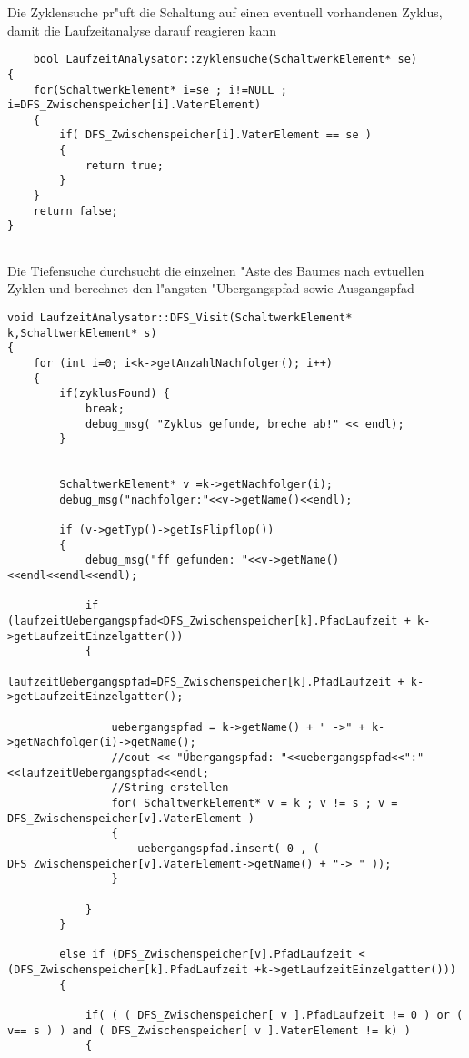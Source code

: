 \documentclass[11pt]{article}
\begin{document}
Die Zyklensuche pr"uft die Schaltung auf einen eventuell vorhandenen Zyklus, damit die Laufzeitanalyse darauf reagieren kann
\begin{lstlisting}
	bool LaufzeitAnalysator::zyklensuche(SchaltwerkElement* se)
{
    for(SchaltwerkElement* i=se ; i!=NULL ; i=DFS_Zwischenspeicher[i].VaterElement)
    {
        if( DFS_Zwischenspeicher[i].VaterElement == se )
        {
            return true;
        }
    }
    return false;
}


\end{lstlisting}


Die Tiefensuche durchsucht die einzelnen "Aste des Baumes nach evtuellen Zyklen und berechnet den l"angsten "Ubergangspfad sowie Ausgangspfad

\begin{lstlisting}
void LaufzeitAnalysator::DFS_Visit(SchaltwerkElement* k,SchaltwerkElement* s)
{
    for (int i=0; i<k->getAnzahlNachfolger(); i++)
    {
        if(zyklusFound) {
            break;
            debug_msg( "Zyklus gefunde, breche ab!" << endl);
        }


        SchaltwerkElement* v =k->getNachfolger(i);
        debug_msg("nachfolger:"<<v->getName()<<endl);

        if (v->getTyp()->getIsFlipflop())
        {
            debug_msg("ff gefunden: "<<v->getName()<<endl<<endl<<endl);

            if (laufzeitUebergangspfad<DFS_Zwischenspeicher[k].PfadLaufzeit + k->getLaufzeitEinzelgatter())
            {
                laufzeitUebergangspfad=DFS_Zwischenspeicher[k].PfadLaufzeit + k->getLaufzeitEinzelgatter();

                uebergangspfad = k->getName() + " ->" + k->getNachfolger(i)->getName();
                //cout << "Übergangspfad: "<<uebergangspfad<<":"<<laufzeitUebergangspfad<<endl;
                //String erstellen
                for( SchaltwerkElement* v = k ; v != s ; v = DFS_Zwischenspeicher[v].VaterElement )
                {
                    uebergangspfad.insert( 0 , ( DFS_Zwischenspeicher[v].VaterElement->getName() + "-> " ));
                }

            }
        }

        else if (DFS_Zwischenspeicher[v].PfadLaufzeit < (DFS_Zwischenspeicher[k].PfadLaufzeit +k->getLaufzeitEinzelgatter()))
        {

            if( ( ( DFS_Zwischenspeicher[ v ].PfadLaufzeit != 0 ) or ( v== s ) ) and ( DFS_Zwischenspeicher[ v ].VaterElement != k) )
            {


\end{lstlisting}
\end{document}
